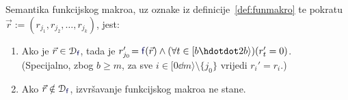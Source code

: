 \begin{propozicija}[{name=[semantika funkcijskog makroa]}]\label{prop:semfmacro}
Semantika funkcijskog makroa, uz oznake iz definicije~\ref{def:funmakro} te pokratu $\vec r:=(r_{j_1},r_{j_2},\dotsc,r_{j_k})$, jest:
\begin{enumerate}
    \item\label{case:in} Ako je $\vec r\in\dom{\f{f}}$, tada je $r_{j_0}'\!=\f{f}(\vec r)\land(\forall t\in[b\dd 2b\rangle)(r_t'=0)$.\\
    (Specijalno, zbog $b\ge m$, za sve $i\in[0\dd m\rangle\setminus\{j_0\}$ vrijedi $r_i'=r_i$.)
    \item\label{case:notin} Ako $\vec r\notin\dom{\f{f}}$, izvršavanje funkcijskog makroa ne stane.
\end{enumerate}
\end{propozicija}
